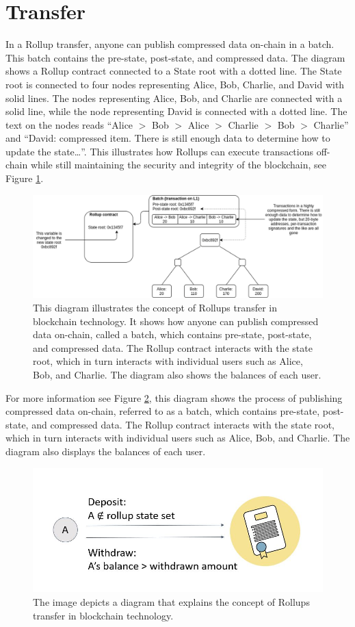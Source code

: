 \section{Transfer}
In a Rollup transfer, anyone can publish compressed data on-chain in a batch. This batch contains the pre-state, post-state, and compressed data. The diagram shows a Rollup contract connected to a State root with a dotted line. The State root is connected to four nodes representing Alice, Bob, Charlie, and David with solid lines. The nodes representing Alice, Bob, and Charlie are connected with a solid line, while the node representing David is connected with a dotted line. The text on the nodes reads “Alice $>$ Bob $>$ Alice $>$ Charlie $>$ Bob $>$ Charlie” and “David: compressed item. There is still enough data to determine how to update the state…”. This illustrates how Rollups can execute transactions off-chain while still maintaining the security and integrity of the blockchain, see Figure \ref{fig:L14_f2}.
\begin{center}
	\begin{figure}
		\centering
		\includegraphics[width=0.8\linewidth]{Fig/14/F2}
		\caption{This diagram illustrates the concept of Rollups transfer in blockchain technology. It shows how anyone can publish compressed data on-chain, called a batch, which contains pre-state, post-state, and compressed data. The Rollup contract interacts with the state root, which in turn interacts with individual users such as Alice, Bob, and Charlie. The diagram also shows the balances of each user.
		}
		\label{fig:L14_f2}
	\end{figure}
\end{center}
For more information see Figure \ref{fig:L14_f3}, this diagram shows the process of publishing compressed data on-chain, referred to as a batch, which contains pre-state, post-state, and compressed data. The Rollup contract interacts with the state root, which in turn interacts with individual users such as Alice, Bob, and Charlie. The diagram also displays the balances of each user.
\begin{center}
	\begin{figure}
		\centering
		\includegraphics[width=0.8\linewidth]{Fig/14/F3}
		\caption{The image depicts a diagram that explains the concept of Rollups transfer in blockchain technology.
		}
		\label{fig:L14_f3}
	\end{figure}
\end{center}
